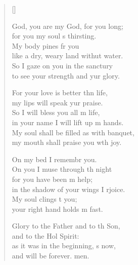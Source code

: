 \settowidth{\versewidth}{My soul shall be filled as with a banquet, *}
\begin{verse}[\versewidth]
  \begin{patverse}
     God, you are my God, for you  long;\Med\\
for you my soul \pointup{\i}s thirsting.\\
My body pines fr you\Med\\
like a dry, weary land withut water.\\
So I gaze on you in the sanctury\Med\\
to see your strength and yur glory.

For your love is better thn life,\Med\\
my lips will speak yur praise.\\
So I will bless you all m life,\Med\\
in your name I will lift up m hands.\\
My soul shall be filled as with  banquet,\Med\\
my mouth shall praise you w\pointup{\i}th joy.

On my bed I remembr you.\Med\\
On you I muse through th night\\
for you have been m help;\Med\\
in the shadow of your wings I rjoice.\\
My soul clings t you;\Med\\
your right hand holds m fast.

Glory to the Father and to th Son,\Med\\
and to the Hol Spirit:\\
as it was in the beginning, \pointup{\i}s now,\Med\\
and will be forever. men.
  \end{patverse}
\end{verse}
